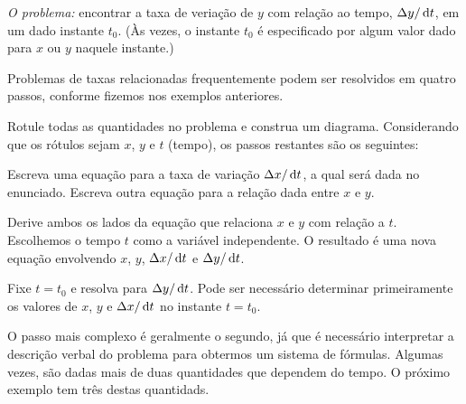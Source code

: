 \emph{O problema:} encontrar a taxa de veriação de $y$ com relação ao
tempo, $\dy/\dt$, em um dado instante $t_0$. (Às vezes, o instante $t_0$
é especificado por algum valor dado para $x$ ou $y$ naquele instante.)

Problemas de taxas relacionadas frequentemente podem ser resolvidos em
quatro passos, conforme fizemos nos exemplos anteriores.
\begin{stepanalysis}
\item Rotule todas as quantidades no problema e construa um diagrama.
      Considerando que os rótulos sejam $x$, $y$ e $t$ (tempo), os
      passos restantes são os seguintes:
\item Escreva uma equação para a taxa de variação $\dx/\dt$, a qual
      será dada no enunciado. Escreva outra
      equação para a relação dada entre $x$ e $y$.
\item Derive ambos os lados da equação que relaciona $x$ e $y$ com
      relação a $t$. Escolhemos o tempo $t$ como a variável independente.
      O resultado é uma nova equação envolvendo $x$, $y$, $\dx/\dt$ e
      $\dy/\dt$.
\item Fixe $t = t_0$ e resolva para $\dy/\dt$. Pode ser necessário
      determinar primeiramente os valores de $x$, $y$ e $\dx/\dt$ no
      instante $t = t_0$.
\end{stepanalysis}

O passo mais complexo é geralmente o segundo, já que é necessário
interpretar a descrição verbal do problema para obtermos um sistema
de fórmulas. Algumas vezes, são dadas mais de duas quantidades que
dependem do tempo. O próximo exemplo tem três destas quantidads.

